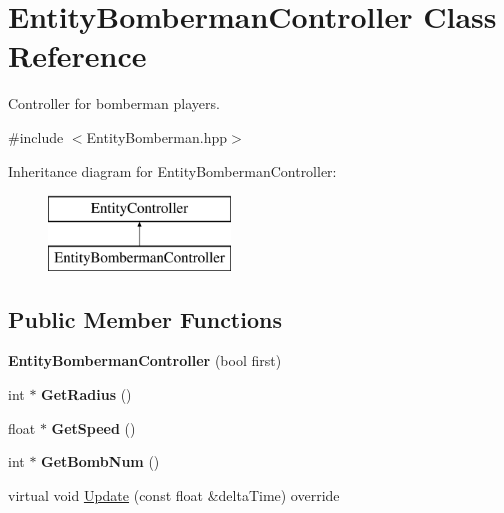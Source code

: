 \hypertarget{class_entity_bomberman_controller}{}\section{Entity\+Bomberman\+Controller Class Reference}
\label{class_entity_bomberman_controller}


Controller for bomberman players.  




{\ttfamily \#include $<$Entity\+Bomberman.\+hpp$>$}

Inheritance diagram for Entity\+Bomberman\+Controller\+:\begin{figure}[H]
\begin{center}
\leavevmode
\includegraphics[height=2.000000cm]{class_entity_bomberman_controller}
\end{center}
\end{figure}
\subsection*{Public Member Functions}
\begin{DoxyCompactItemize}
\item 
\mbox{\label{class_entity_bomberman_controller_a0462c3732716eb3f92d9e0d256715aee}} 
{\bfseries Entity\+Bomberman\+Controller} (bool first)
\item 
\mbox{\label{class_entity_bomberman_controller_a038b57b0f1bbf2734b5cb4af030e4a8d}} 
int $\ast$ {\bfseries Get\+Radius} ()
\item 
\mbox{\label{class_entity_bomberman_controller_a1c6c4e1d622057270f636cf9f2e19498}} 
float $\ast$ {\bfseries Get\+Speed} ()
\item 
\mbox{\label{class_entity_bomberman_controller_a94d0567a89a3c2605acab68bff9b0376}} 
int $\ast$ {\bfseries Get\+Bomb\+Num} ()
\item 
virtual void \mbox{\hyperlink{class_entity_bomberman_controller_a46f91e9853f7d9fcd7d01421221ffc66}{Update}} (const float \&delta\+Time) override
\end{DoxyCompactItemize}

